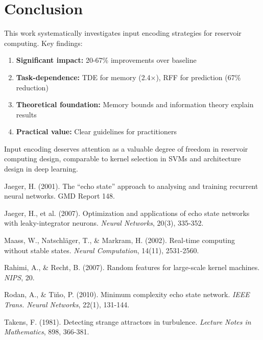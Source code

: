 \documentclass[11pt]{article}
\begin{document}
\section{Conclusion}

This work systematically investigates input encoding strategies for reservoir computing. Key findings:

\begin{enumerate}
    \item \textbf{Significant impact:} 20-67\% improvements over baseline
    \item \textbf{Task-dependence:} TDE for memory (2.4×), RFF for prediction (67\% reduction)
    \item \textbf{Theoretical foundation:} Memory bounds and information theory explain results
    \item \textbf{Practical value:} Clear guidelines for practitioners
\end{enumerate}

Input encoding deserves attention as a valuable degree of freedom in reservoir computing design, comparable to kernel selection in SVMs and architecture design in deep learning.


\begin{thebibliography}{9}

Jaeger, H. (2001). The ``echo state'' approach to analysing and training recurrent neural networks. GMD Report 148.

Jaeger, H., et al. (2007). Optimization and applications of echo state networks with leaky-integrator neurons. \emph{Neural Networks}, 20(3), 335-352.

Maass, W., Natschläger, T., \& Markram, H. (2002). Real-time computing without stable states. \emph{Neural Computation}, 14(11), 2531-2560.

Rahimi, A., \& Recht, B. (2007). Random features for large-scale kernel machines. \emph{NIPS}, 20.

Rodan, A., \& Tiňo, P. (2010). Minimum complexity echo state network. \emph{IEEE Trans. Neural Networks}, 22(1), 131-144.

Takens, F. (1981). Detecting strange attractors in turbulence. \emph{Lecture Notes in Mathematics}, 898, 366-381.

\end{thebibliography}
\end{document}
